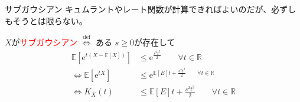 \documentclass[lualatex,handout]{beamer}
\newcommand{\emm}[1]{\textcolor{red}{#1}}
\newcommand{\expt}[1]{\mathbb{E}\left[#1\right]}
\theoremstyle{definition}
\begin{document}
\begin{frame}{サブガウシアン}
キュムラントやレート関数が計算できればよいのだが、必ずしもそうとは限らない。

\vspace{1em}
$X$が\emm{サブガウシアン} $\stackrel{\mathrm{def}}{\iff}$ ある $s\ge0$が存在して
\begin{align*}
\expt{\mathrm{e}^{t(X-\expt{X})}} &\le \mathrm{e}^{\frac{s^2t^2}2}\qquad\forall t\in\mathbb{R}\\
\iff\expt{\mathrm{e}^{tX}} &\le \mathrm{e}^{\expt{E}t+\frac{s^2t^2}2\qquad\forall t\in\mathbb{R}}\\
\iff K_X(t) &\le {\expt{E}t+\frac{s^2t^2}2\qquad\forall t\in\mathbb{R}}\\
\end{align*}
\end{frame}

\end{document}
